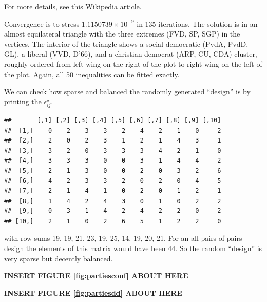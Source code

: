 \documentclass[
  12pt,
]{article}
\begin{document}
For more details, see this \href{https://en.wikipedia.org/wiki/List_of_political_parties_in_the_Netherlands}{Wikipedia article}.

Convergence is to stress \ensuremath{1.1150739\times 10^{-9}} in 135 iterations. The solution is
in an almost equilateral triangle with the three extremes (FVD, SP, SGP) in the
vertices. The interior of the triangle shows a social democratic (PvdA, PvdD, GL),
a liberal (VVD, D'66), and a christian democrat (ARP, CU, CDA) cluster,
roughly ordered from left-wing on the right of the plot to right-wing on the left of the plot. Again, all 50 inequalities can be fitted exactly.

We can check how sparse and balanced the randomly generated ``design'' is by printing the \(\epsilon_{ij}^\star\).

\begin{verbatim}
##       [,1] [,2] [,3] [,4] [,5] [,6] [,7] [,8] [,9] [,10]
##  [1,]    0    2    3    3    2    4    2    1    0     2
##  [2,]    2    0    2    3    1    2    1    4    3     1
##  [3,]    3    2    0    3    3    3    4    2    1     0
##  [4,]    3    3    3    0    0    3    1    4    4     2
##  [5,]    2    1    3    0    0    2    0    3    2     6
##  [6,]    4    2    3    3    2    0    2    0    4     5
##  [7,]    2    1    4    1    0    2    0    1    2     1
##  [8,]    1    4    2    4    3    0    1    0    2     2
##  [9,]    0    3    1    4    2    4    2    2    0     2
## [10,]    2    1    0    2    6    5    1    2    2     0
\end{verbatim}

with row sums 19, 19, 21, 23, 19, 25, 14, 19, 20, 21. For an all-pairs-of-pairs design the
elements of this matrix would have been 44. So the random
``design'' is very sparse but decently balanced.

\begin{greybox}

\begin{center}
\textbf{INSERT FIGURE \ref{fig:partiesconf} ABOUT HERE}

\end{center}

\end{greybox}

\begin{greybox}

\begin{center}
\textbf{INSERT FIGURE \ref{fig:partiesdd} ABOUT HERE}

\end{center}

\end{greybox}
\end{document}

